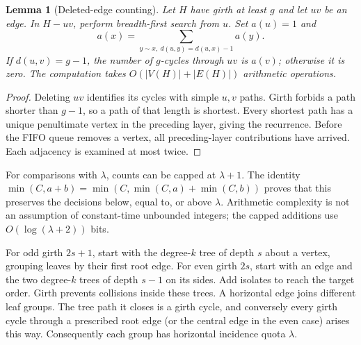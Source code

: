 \documentclass[11pt,a4paper]{article}
\newtheorem{lemma}[theorem]{Lemma}
\begin{document}
\begin{lemma}[Deleted-edge counting]\label{lem:count}
Let $H$ have girth at least $g$ and let $uv$ be an edge. In $H-uv$,
perform breadth-first search from $u$. Set $a(u)=1$ and
\[
a(x)=\sum_{y\sim x,\ d(u,y)=d(u,x)-1}a(y).
\]
If $d(u,v)=g-1$, the number of $g$-cycles through $uv$ is $a(v)$;
otherwise it is zero. The computation takes $O(|V(H)|+|E(H)|)$
arithmetic operations.
\end{lemma}
\begin{proof}
Deleting $uv$ identifies its cycles with simple $u,v$ paths. Girth
forbids a path shorter than $g-1$, so a path of that length is shortest.
Every shortest path has a unique penultimate vertex in the preceding
layer, giving the recurrence. Before the FIFO queue removes a vertex,
all preceding-layer contributions have arrived. Each adjacency is
examined at most twice.
\end{proof}
For comparisons with $\lambda$, counts can be capped at $\lambda+1$.
The identity $\min(C,a+b)=\min(C,\min(C,a)+\min(C,b))$ proves that this
preserves the decisions below, equal to, or above $\lambda$. Arithmetic
complexity is not an assumption of constant-time unbounded integers;
the capped additions use $O(\log(\lambda+2))$ bits.

For odd girth $2s+1$, start with the degree-$k$ tree of depth $s$
about a vertex, grouping leaves by their first root edge. For even girth
$2s$, start with an edge and the two degree-$k$ trees of depth $s-1$
on its sides. Add isolates to reach the target order. Girth prevents
collisions inside these trees. A horizontal edge joins different leaf
groups. The tree path it closes is a girth cycle, and conversely every
girth cycle through a prescribed root edge (or the central edge in the
even case) arises this way. Consequently each group has horizontal
incidence quota $\lambda$.
\end{document}
